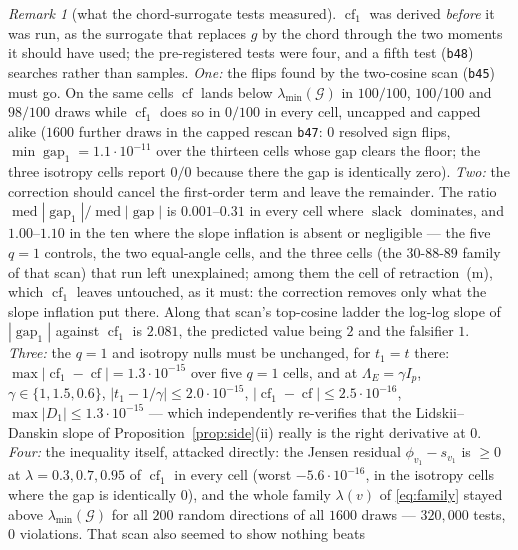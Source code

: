 \documentclass[11pt]{article}
\theoremstyle{remark}
\newtheorem{remark}{Remark}[section]
\newcommand{\Gr}{\mathcal{G}}
\newcommand{\Le}{\Lambda_E}
\begin{document}
\begin{remark}[what the chord-surrogate tests measured]\label{rem:chord}
$\operatorname{cf}_1$ was derived \emph{before} it was run, as the surrogate that replaces $g$ by the
chord through the two moments it should have used; the pre-registered tests were four, and
a fifth test (\texttt{b48}) searches rather than samples.
\emph{One:} the flips found by the two-cosine scan (\texttt{b45}) must go. On the same cells $\operatorname{cf}$ lands below
$\lambda_{\min}(\Gr)$ in $100/100$, $100/100$ and $98/100$ draws while $\operatorname{cf}_1$ does so in
$0/100$ in every cell, uncapped and capped alike ($1600$ further draws in the capped rescan \texttt{b47}: $0$ resolved
sign flips, $\min\operatorname{gap}_1=1.1\cdot10^{-11}$ over the thirteen cells whose gap clears the
floor; the three isotropy cells report $0/0$ because there the gap is identically zero). \emph{Two:} the correction should
cancel the first-order term and leave the remainder. The ratio
$\operatorname{med}|\operatorname{gap}_1|/\operatorname{med}|\operatorname{gap}|$ is $0.001$--$0.31$
in every cell where $\operatorname{slack}$ dominates, and $1.00$--$1.10$ in the ten where the slope
inflation is absent or negligible --- the five $q=1$ controls, the two equal-angle cells, and the three
cells (the $30$-$88$-$89$ family of that scan) that run left unexplained; among them the cell of
retraction~(m), which $\operatorname{cf}_1$ leaves untouched, as it must: the correction removes only
what the slope inflation put there. Along that scan's top-cosine ladder the log-log slope of
$|\operatorname{gap}_1|$ against $\operatorname{cf}_1$ is $2.081$, the predicted value being $2$ and
the falsifier $1$. \emph{Three:} the $q=1$ and isotropy nulls must be unchanged, for $t_1=t$ there:
$\max|\operatorname{cf}_1-\operatorname{cf}|=1.3\cdot10^{-15}$ over five $q=1$ cells, and at
$\Le=\gamma I_p$, $\gamma\in\{1,1.5,0.6\}$, $|t_1-1/\gamma|\le2.0\cdot10^{-15}$,
$|\operatorname{cf}_1-\operatorname{cf}|\le2.5\cdot10^{-16}$, $\max|D_1|\le1.3\cdot10^{-15}$ --- which
independently re-verifies that the Lidskii--Danskin slope of Proposition~\ref{prop:side}(ii) really is
the right derivative at $0$. \emph{Four:} the inequality itself, attacked directly: the Jensen residual
$\phi_{v_1}-s_{v_1}$ is $\ge0$ at $\lambda=0.3,0.7,0.95$ of $\operatorname{cf}_1$ in every cell (worst
$-5.6\cdot10^{-16}$, in the isotropy cells where the gap is identically $0$), and the whole family
$\lambda(v)$ of \eqref{eq:family} stayed above $\lambda_{\min}(\Gr)$ for all $200$ random directions of
all $1600$ draws --- $320{,}000$ tests, $0$ violations. That scan also seemed to show nothing beats

\end{remark}
\end{document}
